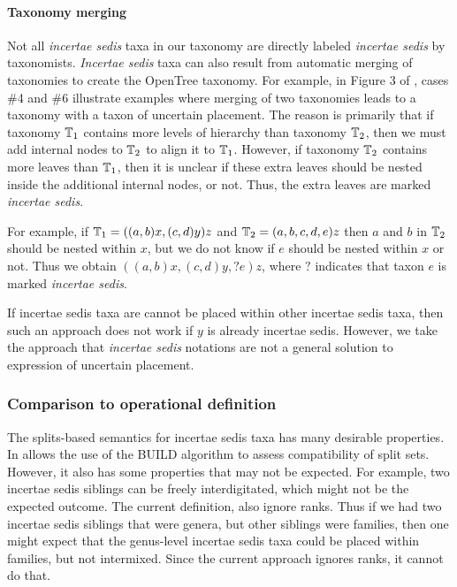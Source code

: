 \documentclass[english]{article}
\begin{document}
\paragraph{Taxonomy merging}

Not all \emph{incertae sedis} taxa in our taxonomy are directly
labeled \emph{incertae sedis} by taxonomists.
\emph{Incertae sedis}
taxa can also result from automatic merging of taxonomies to create
the OpenTree taxonomy.
For example, in Figure 3 of
\citet{rees2017automated}, cases \#4 and \#6 illustrate examples where
merging of two taxonomies leads to a taxonomy with a taxon of
uncertain placement.
The reason is primarily that if taxonomy
$\mbox{\ensuremath{\mathbb{T}}}_{1}$ contains more levels of hierarchy than taxonomy
$\mbox{\ensuremath{\mathbb{T}}}_{2}$, then we must add internal nodes to $\mbox{\ensuremath{\mathbb{T}}}_{2}$ to
align it to $\mbox{\ensuremath{\mathbb{T}}}_{1}$.
However, if taxonomy $\mbox{\ensuremath{\mathbb{T}}}_{2}$
contains more leaves than $\mbox{\ensuremath{\mathbb{T}}}_{1}$, then it is unclear if these
extra leaves should be nested inside the additional internal nodes, or
not.
Thus, the extra leaves are marked \emph{incertae sedis}.

For example, if $\mbox{\ensuremath{\mathbb{T}}}_{1}=((a,b)x,(c,d)y)z$ and
$\mbox{\ensuremath{\mathbb{T}}}_{2}=(a,b,c,d,e)z$ then $a$ and $b$ in $\mbox{\ensuremath{\mathbb{T}}}_{2}$
should be nested within $x$, but we do not know if $e$ should be
nested within $x$ or not.
Thus we obtain $((a,b)x,(c,d)y,?e)z$, where
$?$ indicates that taxon $e$ is marked \emph{incertae sedis}.

If incertae sedis taxa are cannot be placed within other incertae
sedis taxa, then such an approach does not work if $y$ is already
incertae sedis.
However, we take the approach that \emph{incertae
sedis} notations are not a general solution to expression of uncertain
placement.

\subsubsection{Comparison to operational definition}

The splits-based semantics for incertae sedis taxa has many desirable
properties.
In allows the use of the BUILD algorithm to assess
compatibility of split sets.
However, it also has some properties that
may not be expected.
For example, two incertae sedis siblings can be
freely interdigitated, which might not be the expected outcome.
The
current definition, also ignore ranks.
Thus if we had two incertae
sedis siblings that were genera, but other siblings were families,
then one might expect that the genus-level incertae sedis taxa could
be placed within families, but not intermixed.
Since the current
approach ignores ranks, it cannot do that.
\end{document}
